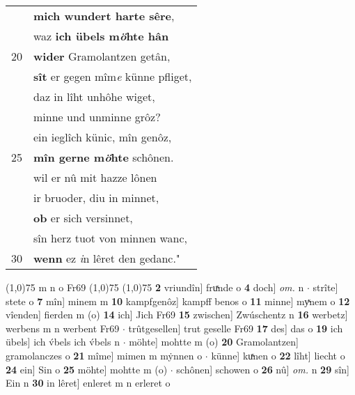 \documentclass[8pt,a4paper,notitlepage]{article}
\begin{document}
\begin{table}[ht]
\begin{minipage}[t]{0.5\linewidth}
\begin{tabular}{rl}
 & \textbf{mich wundert harte sêre},\\ 
 & waz \textbf{ich übels m\textit{ö}hte hân}\\ 
20 & \textbf{wider} Gramolantzen getân,\\ 
 & \textbf{sît} er gegen mîm\textit{e} künne pfliget,\\ 
 & daz in lîht unhôhe wiget,\\ 
 & minne und unminne grôz?\\ 
 & ein ieglîch künic, mîn genôz,\\ 
25 & \textbf{mîn gerne m\textit{ö}hte} schônen.\\ 
 & wil er nû mit hazze lônen\\ 
 & ir bruoder, diu in minnet,\\ 
 & \textbf{ob} er sich versinnet,\\ 
 & sîn herz tuot von minnen wanc,\\ 
30 & \textbf{wenn} ez \textit{i}n lêret den gedanc."\\ 
\end{tabular}
\scriptsize
\line(1,0){75} \newline
m n o Fr69 \newline
\line(1,0){75} \newline
\newline
\line(1,0){75} \newline
\textbf{2} vriundîn] fruͯnde o \textbf{4} doch] \textit{om.} n  $\cdot$ strîte] stete o \textbf{7} mîn] minem m \textbf{10} kampfgenôz] kampff benos o \textbf{11} minne] myͯnem o \textbf{12} vîenden] fierden m (o) \textbf{14} ich] Jich Fr69 \textbf{15} zwischen] Zwúschentz n \textbf{16} werbetz] werbens m n werbent Fr69  $\cdot$ trûtgesellen] trut geselle Fr69 \textbf{17} des] das o \textbf{19} ich übels] ich v́bels ich v́bels n  $\cdot$ möhte] mohtte m (o) \textbf{20} Gramolantzen] gramolanczes o \textbf{21} mîme] mimen m mẏnnen o  $\cdot$ künne] kuͯnen o \textbf{22} lîht] liecht o \textbf{24} ein] Sin o \textbf{25} möhte] mohtte m (o)  $\cdot$ schônen] schowen o \textbf{26} nû] \textit{om.} n \textbf{29} sîn] Ein n \textbf{30} in lêret] enleret m n erleret o \newline
\end{minipage}
\end{table}
\newpage
\end{document}
